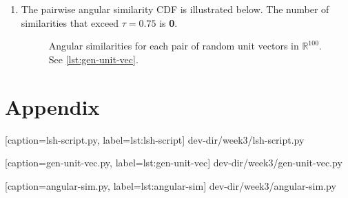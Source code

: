 \documentclass{article}
\begin{document}
\begin{enumerate}[leftmargin={*}, font={\bf}, label={\arabic*.}, ref={\arabic*}]
\begin{enumerate}[label={(\Alph*)}, ref={\theenumi(\Alph*)}]
      \item \label{qst:3B}
        The pairwise angular similarity CDF is illustrated below. The number of similarities
        that exceed $\tau=0.75$ is {\bf 0}.
        \begin{figure}[H]
          \centering
          \caption{
            Angular similarities for each pair of random unit vectors in $\mathbb{R}^{100}$.
            See \autoref{lst:gen-unit-vec}.
          }
          \label{fig:angular-sim-cdf-plot}
        \end{figure}
    \end{enumerate}
\end{enumerate}

\newpage

\section*{Appendix}


  [caption={\sf lsh-script.py}, label={lst:lsh-script}]
  {dev-dir/week3/lsh-script.py}
  
\newpage


  [caption={\sf gen-unit-vec.py}, label={lst:gen-unit-vec}]
  {dev-dir/week3/gen-unit-vec.py}
  
\newpage


  [caption={\sf angular-sim.py}, label={lst:angular-sim}]
  {dev-dir/week3/angular-sim.py}
\end{document}
